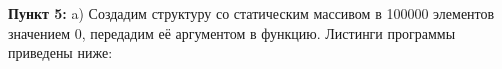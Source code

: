 \documentclass[a4paper,12pt]{article}
\begin{document}
\textbf{Пункт 5:} 
a) Создадим структуру со статическим массивом в 100000 элементов значением 0, передадим её аргументом в функцию. Листинги программы приведены ниже: 
\begin{figure}[H]\label{fig: 5aCpp32 and 5aCpp64}
\end{figure}
\end{document}
